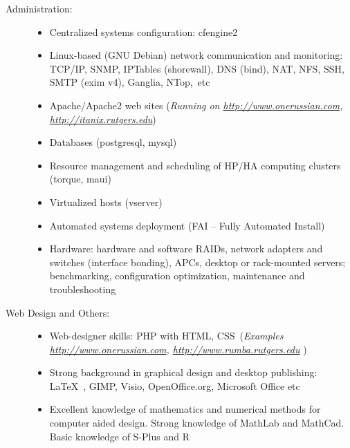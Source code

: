\documentclass[10pt,overlapped,line]{res}
\newcommand{\wdescription}[1]{({\small \textit{#1}})}
\begin{document}
\begin{resume}
\begin{description}
    \item[Administration:] \hspace*{\fill}
      \begin{itemize}

      \item Centralized systems configuration: cfengine2

      \item Linux-based (GNU Debian) network communication and
        monitoring: TCP/IP, SNMP, IPTables (shorewall), DNS (bind), NAT,
        NFS, SSH, SMTP (exim v4), Ganglia, NTop,\ etc

      \item Apache/Apache2 web sites
        \wdescription{Running on
          \url{http://www.onerussian.com}, \url{http://itanix.rutgers.edu}}

      \item Databases (postgresql, mysql)

      \item Resource management and scheduling of HP/HA computing
        clusters (torque, maui)

      \item Virtualized hosts (vserver)

      \item Automated systems deployment (FAI -- Fully Automated Install)

      \item Hardware: hardware and software RAIDs, network adapters
        and switches (interface bonding), APCs, desktop or
        rack-mounted servers; benchmarking, configuration
        optimization, maintenance and troubleshooting

      \end{itemize}

    \item[Web Design and Others:]  \hspace*{\fill}
      \begin{itemize}
      \item Web-designer skills: PHP with HTML, CSS\ 
        \wdescription{Examples
          \url{http://www.onerussian.com},
          \url{http://www.rumba.rutgers.edu}
}
      \item Strong background in graphical design and desktop
        publishing: \LaTeX\ , GIMP, Visio, OpenOffice.org, Microsoft Office etc

      \item Excellent knowledge of mathematics and numerical methods
        for computer aided design. Strong knowledge of MathLab and
        MathCad. Basic knowledge of S-Plus and R


\end{itemize}
\end{description}
\end{resume}
\end{document}
